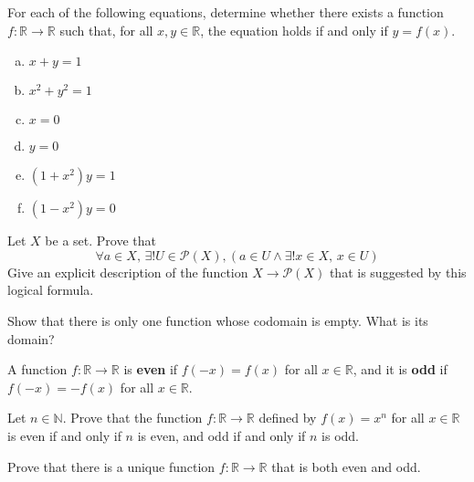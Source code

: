 \begin{chapex}
For each of the following equations, determine whether there exists a function $f : \mathbb{R} \to \mathbb{R}$ such that, for all $x,y \in \mathbb{R}$, the equation holds if and only if $y=f(x)$.
\begin{multicols}{3}
\begin{enumerate}[(a)]
\item $x+y=1$
\item $x^2+y^2=1$
\item $x=0$
\item $y=0$
\item $(1+x^2)y=1$
\item $(1-x^2)y=0$
\end{enumerate}
\end{multicols}
\end{chapex}

\begin{chapex}
Let $X$ be a set. Prove that
\[ \forall a \in X,\, \exists ! U \in \mathcal{P}(X), (a \in U \wedge \exists ! x \in X,\, x \in U) \]
Give an explicit description of the function $X \to \mathcal{P}(X)$ that is suggested by this logical formula.
\end{chapex}

\begin{chapex}
Show that there is only one function whose codomain is empty. What is its domain?
\end{chapex}

\begin{definition}
\label{defEvenOddFunction}
A function $f : \mathbb{R} \to \mathbb{R}$ is \textbf{even} if $f(-x)=f(x)$ for all $x \in \mathbb{R}$, and it is \textbf{odd} if $f(-x)=-f(x)$ for all $x \in \mathbb{R}$.
\end{definition}

\begin{chapex}
Let $n \in \mathbb{N}$. Prove that the function $f : \mathbb{R} \to \mathbb{R}$ defined by $f(x)=x^n$ for all $x \in \mathbb{R}$ is even if and only if $n$ is even, and odd if and only if $n$ is odd.
\end{chapex}

\begin{chapex}
Prove that there is a unique function $f : \mathbb{R} \to \mathbb{R}$ that is both even and odd.
\end{chapex}

